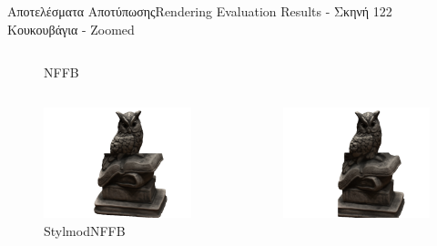 \documentclass[10pt]{beamer}
\begin{document}
\begin{frame}{Αποτελέσματα Αποτύπωσης}{Rendering Evaluation Results - Σκηνή 122 Κουκουβάγια - Zoomed}
\begin{columns}[T]
\begin{figure}
                \caption{\tiny{NFFB}}
            \end{figure}
    \end{columns}
    \begin{columns}[T]
            \begin{figure}
                \includegraphics[height=.3\textheight, width=\linewidth, keepaspectratio]{images/chapter5_img/RenderingResults/StylemodNFFB/eval_055_zoomed.jpg}
                \caption{\tiny{StylmodNFFB}}
            \end{figure}
            \begin{figure}
                \includegraphics[height=.3\textheight, width=\linewidth, keepaspectratio]{images/chapter5_img/RenderingResults/MRHashGrid3DTCNN/eval_055_zoomed.jpg}

\end{figure}
\end{columns}
\end{frame}
\end{document}
